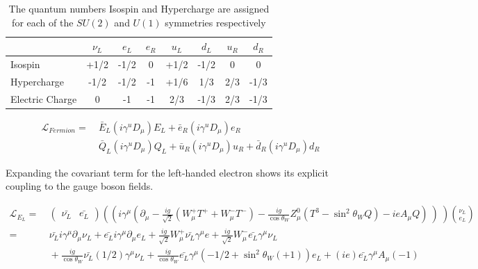 \begin{table}[h]
  \begin{center}
  \begin{tabular}{ | l | c | c | c | c | c | c | c | } \hline
    & $\nu_{L}$ & $e_{L}$ & $e_{R}$ & $u_{L}$ & $d_{L}$ & $u_{R}$ &
    $d_{R}$ \\ \hline
    Isospin & +1/2 & -1/2 & 0 & +1/2 & -1/2 & 0 & 0 \\ \hline
    Hypercharge & -1/2 & -1/2 & -1 & +1/6 & 1/3 & 2/3 & -1/3 \\ \hline
    Electric Charge & 0 & -1 & -1 & 2/3 & -1/3 & 2/3 & -1/3 \\ \hline
  \end{tabular}
  \caption{ The quantum numbers Isospin and Hypercharge are assigned for each of the $SU(2)$ and
      $U(1)$ symmetries respectively}
    \label{tab:ewk_fermion_quantum_numbers}
  \end{center}
\end{table} 

\begin{equation}\label{eq:ewk_fermionic_lagrangian_term}
\begin{aligned}
\mathcal{L}_{Fermion} =&~ \bar{E}_{L}(i\gamma^{u}D_{\mu})E_{L} +
\bar{e}_{R}(i\gamma^{u}D_{\mu})e_{R} \\
&~ \bar{Q}_{L}(i\gamma^{u}D_{\mu})Q_{L} +
\bar{u}_{R}(i\gamma^{u}D_{\mu})u_{R} +
\bar{d}_{R}(i\gamma^{u}D_{\mu})d_{R}
\end{aligned}
\end{equation} 

\noindent Expanding the covariant term for the left-handed electron
shows its explicit coupling to the gauge boson fields. 

\begin{equation}\label{eq:ewk_eLeft_lagrangian_term}
\begin{aligned}
\mathcal{L}_{E_{L}} =&~ 
\begin{pmatrix}
  \bar{\nu_{L}} & \bar{e_{L}} 
\end{pmatrix}
\left( (i\gamma^{\mu}(\partial_{\mu} -
  \frac{ig}{\sqrt{2}}(W_{\mu}^{+}T^{+} + W_{\mu}^{-}T^{-}) -
  \frac{ig}{\cos{\theta_{W}}}Z_{\mu}^{0}(T^{3}-\sin^{2}{\theta_{W}}Q)
  - ieA_{\mu}Q)~)~\right)\binom{\nu_{L}}{e_{L}} \\
=&~\bar{\nu_{L}}i\gamma^{\mu}\partial_{\mu}\nu_{L} +
\bar{e_{L}}i\gamma^{\mu}\partial_{\mu}e_{L}
+\frac{ig}{\sqrt{2}}W_{\mu}^{+}\bar{\nu_{L}}\gamma^{\mu}e +
\frac{ig}{\sqrt{2}}W_{\mu}^{-}\bar{e_{L}}\gamma^{\mu}\nu_{L} \\
&~+\frac{ig}{\cos{\theta_{W}}}\bar{\nu_{L}}(1/2)\gamma^{\mu}\nu_{L} +
\frac{ig}{\cos{\theta_{W}}}\bar{e_{L}}\gamma^{\mu}(-1/2 +
\sin^{2}{\theta_{W}}(+1))e_{L} + (ie)\bar{e_{L}}\gamma^{\mu}A_{\mu}(-1)
\end{aligned}
\end{equation}

